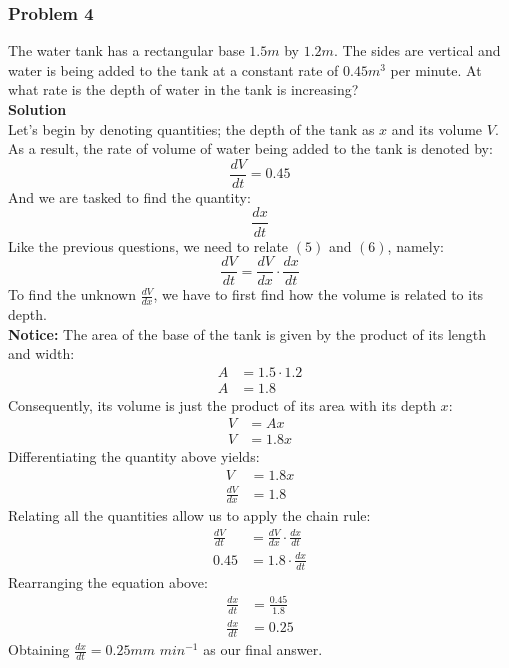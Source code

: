 \documentclass[hidelinks, a4paper, 12pt]{article}
\newcommand{\bd}{\textbf}
\newcommand{\n}{\\[\baselineskip]}
\begin{document}
            \subsubsection{Problem 4}
                The water tank has a rectangular base $1.5m$ by $1.2m$. The sides are vertical and water
                is being added to the tank at a constant rate of $0.45m^3$ per minute. At what rate is the depth
                of water in the tank is increasing?\n
                \bd{Solution}\n
                Let's begin by denoting quantities; the depth of the tank as $x$ and its volume $V$.\n
                As a result, the rate of volume of water being added to the tank is denoted by:
                \begin{equation}
                    \frac{dV}{dt} = 0.45
                \end{equation}
                And we are tasked to find the quantity:
                \begin{equation}
                    \frac{dx}{dt}
                \end{equation}
                Like the previous questions, we need to relate $(5)$ and $(6)$, namely:
                \[\frac{dV}{dt} = \frac{dV}{dx} \cdot \frac{dx}{dt}\]
                To find the unknown $\frac{dV}{dx}$, we have to first find how the volume is related to its depth.\n
                \bd{Notice:} The area of the base of the tank is given by the product of its length and width:
                \[\begin{split}
                    A &= 1.5 \cdot 1.2\\
                    A &= 1.8
                \end{split}\]
                Consequently, its volume is just the product of its area with its depth $x$:
                \[\begin{split}
                    V &= Ax\\
                    V &= 1.8x
                \end{split}\]
                Differentiating the quantity above yields:
                \[\begin{split}
                    V &= 1.8x\\
                    \frac{dV}{dx} &= 1.8
                \end{split}\]
                Relating all the quantities allow us to apply the chain rule:
                \[\begin{split}
                    \frac{dV}{dt} &= \frac{dV}{dx} \cdot \frac{dx}{dt}\\
                    0.45 &= 1.8 \cdot \frac{dx}{dt}
                \end{split}\]
                Rearranging the equation above:
                \[\begin{split}
                    \frac{dx}{dt} &= \frac{0.45}{1.8}\\
                    \frac{dx}{dt} &= 0.25
                \end{split}\]
                Obtaining $\frac{dx}{dt} = 0.25mm$ $min^{-1}$ as our final answer.
\end{document}
